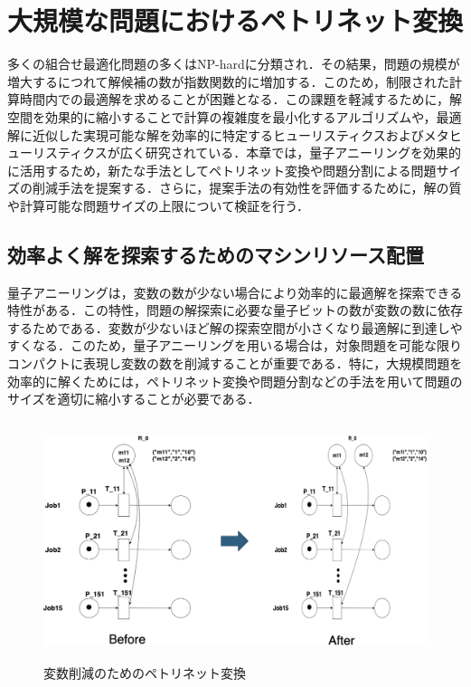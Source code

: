 \chapter{大規模な問題におけるペトリネット変換}
\label{main_survey}

多くの組合せ最適化問題の多くはNP-hardに分類され．その結果，問題の規模が増大するにつれて解候補の数が指数関数的に増加する．このため，制限された計算時間内での最適解を求めることが困難となる．この課題を軽減するために，解空間を効果的に縮小することで計算の複雑度を最小化するアルゴリズムや，最適解に近似した実現可能な解を効率的に特定するヒューリスティクスおよびメタヒューリスティクスが広く研究されている．本章では，量子アニーリングを効果的に活用するため，新たな手法としてペトリネット変換や問題分割による問題サイズの削減手法を提案する．さらに，提案手法の有効性を評価するために，解の質や計算可能な問題サイズの上限について検証を行う．

\section{効率よく解を探索するためのマシンリソース配置}
量子アニーリングは，変数の数が少ない場合により効率的に最適解を探索できる特性がある．この特性，問題の解探索に必要な量子ビットの数が変数の数に依存するためである．変数が少ないほど解の探索空間が小さくなり最適解に到達しやすくなる．このため，量子アニーリングを用いる場合は，対象問題を可能な限りコンパクトに表現し変数の数を削減することが重要である．特に，大規模問題を効率的に解くためには，ペトリネット変換や問題分割などの手法を用いて問題のサイズを適切に縮小することが必要である．

\begin{figure}[H]
    \centering
    \includegraphics[width=0.8\linewidth, height=7cm]{./images/transformation.png}
    \caption{変数削減のためのペトリネット変換}
    \label{fig:fig5}
\end{figure}

